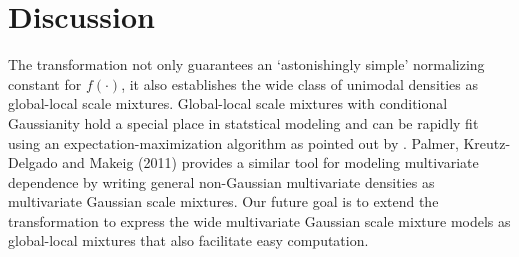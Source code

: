 \documentclass[lineno]{biometrika}
\begin{document}
\section{Discussion}

The \CS transformation not only guarantees an `astonishingly simple' normalizing constant for $f(\cdot)$, it also establishes the wide class of unimodal densities as global-local scale mixtures. Global-local scale mixtures with conditional Gaussianity hold a special place in statstical modeling and can be rapidly fit using an expectation-maximization algorithm as pointed out by \cite{polson2013data}. Palmer, Kreutz-Delgado and Makeig (2011) provides a similar tool for modeling multivariate dependence by writing general non-Gaussian multivariate densities as multivariate Gaussian scale mixtures. Our future goal is to extend the \CS transformation to express the wide multivariate Gaussian scale mixture models as global-local mixtures that also facilitate easy computation. \par
\end{document}
